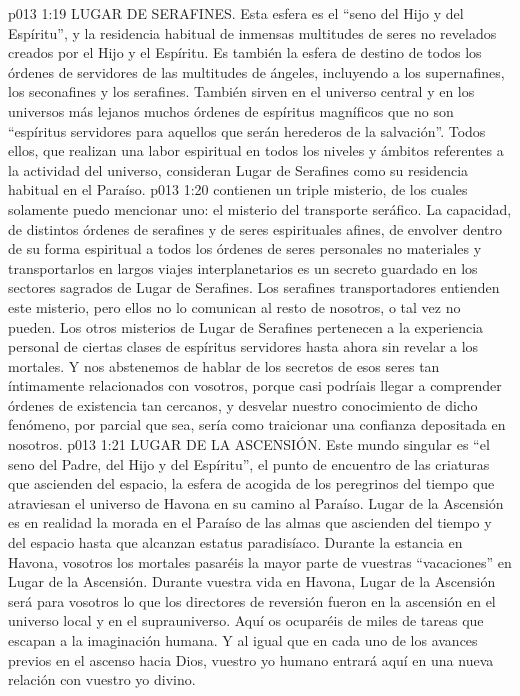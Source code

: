 \vs p013 1:19 LUGAR DE SERAFINES. Esta esfera es el “seno del Hijo y del Espíritu”, y la residencia habitual de inmensas multitudes de seres no revelados creados por el Hijo y el Espíritu. Es también la esfera de destino de todos los órdenes de servidores de las multitudes de ángeles, incluyendo a los supernafines, los seconafines y los serafines. También sirven en el universo central y en los universos más lejanos muchos órdenes de espíritus magníficos que no son “espíritus servidores para aquellos que serán herederos de la salvación”. Todos ellos, que realizan una labor espiritual en todos los niveles y ámbitos referentes a la actividad del universo, consideran Lugar de Serafines como su residencia habitual en el Paraíso.
\vs p013 1:20 \pc {} contienen un triple misterio, de los cuales solamente puedo mencionar uno: el misterio del transporte seráfico. La capacidad, de distintos órdenes de serafines y de seres espirituales afines, de envolver dentro de su forma espiritual a todos los órdenes de seres personales no materiales y transportarlos en largos viajes interplanetarios es un secreto guardado en los sectores sagrados de Lugar de Serafines. Los serafines transportadores entienden este misterio, pero ellos no lo comunican al resto de nosotros, o tal vez no pueden. Los otros misterios de Lugar de Serafines pertenecen a la experiencia personal de ciertas clases de espíritus servidores hasta ahora sin revelar a los mortales. Y nos abstenemos de hablar de los secretos de esos seres tan íntimamente relacionados con vosotros, porque casi podríais llegar a comprender órdenes de existencia tan cercanos, y desvelar nuestro conocimiento de dicho fenómeno, por parcial que sea, sería como traicionar una confianza depositada en nosotros.
\vs p013 1:21 LUGAR DE LA ASCENSIÓN. Este mundo singular es “el seno del Padre, del Hijo y del Espíritu”, el punto de encuentro de las criaturas que ascienden del espacio, la esfera de acogida de los peregrinos del tiempo que atraviesan el universo de Havona en su camino al Paraíso. Lugar de la Ascensión es en realidad la morada en el Paraíso de las almas que ascienden del tiempo y del espacio hasta que alcanzan estatus paradisíaco. Durante la estancia en Havona, vosotros los mortales pasaréis la mayor parte de vuestras “vacaciones” en Lugar de la Ascensión. Durante vuestra vida en Havona, Lugar de la Ascensión será para vosotros lo que los directores de reversión fueron en la ascensión en el universo local y en el suprauniverso. Aquí os ocuparéis de miles de tareas que escapan a la imaginación humana. Y al igual que en cada uno de los avances previos en el ascenso hacia Dios, vuestro yo humano entrará aquí en una nueva relación con vuestro yo divino.
